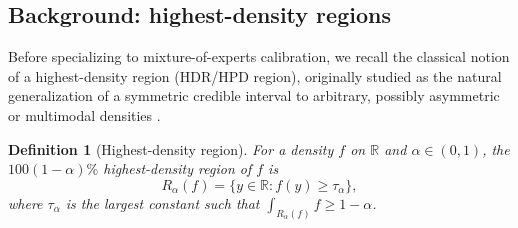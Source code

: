 \documentclass[10pt,twocolumn,a4paper]{article}
\newtheorem{definition}{Definition}
\begin{document}
\subsection{Background: highest-density regions}
\label{sec:hpdbasics}
Before specializing to mixture-of-experts calibration, we recall the classical notion of a
highest-density region (HDR/HPD region), originally studied as the natural generalization of a
symmetric credible interval to arbitrary, possibly asymmetric or multimodal densities
\cite{boxtiao1973bayesian,hyndman1996computing}.

\begin{definition}[Highest-density region]
\label{def:hpd}
For a density $f$ on $\mathbb R$ and $\alpha\in(0,1)$, the $100(1-\alpha)\%$ highest-density region
of $f$ is
\begin{equation}
R_\alpha(f) = \{y \in \mathbb R : f(y) \ge \tau_\alpha\},
\end{equation}
where $\tau_\alpha$ is the largest constant such that $\int_{R_\alpha(f)} f \ge 1-\alpha$.
\end{definition}
\end{document}
